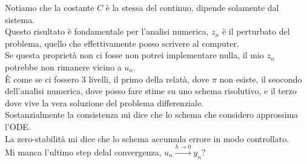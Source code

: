 \documentclass[12px]{article}
\begin{document}
	Notiamo che la costante $C$ è la stessa del continuo, dipende solamente dal sistema.\\
	Questo risultato è fondamentale per l'analisi numerica, $z_n$ è il perturbato del problema, quello che effettivamente posso scrivere al computer.\\
Se questa proprietà non ci fosse non potrei implementare nulla, il mio $z_n$ potrebbe non rimanere vicino a $u_n$.\\
È come se ci fossero 3 livelli, il primo della relatà, dove  $\pi$ non esiste, il seocondo dell'analisi numerica, dove posso fare stime su uno schema risolutivo, e il terzo dove vive la vera soluzione del problema differenziale.\\

Sostanzialmente la consistenza mi dice che lo schema che considero approssima l'ODE.\\

La zero-stabilità mi dice che lo schema accumula errore in modo controllato.\\

Mi manca l'ultimo step delal convergenza, $u_n \xrightarrow{h \rightarrow 0} y_n?$
\end{document}
